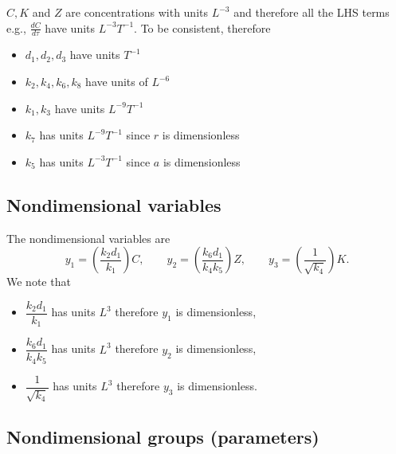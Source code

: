 \documentclass[10pt,letterpaper]{article}
\begin{document}
$C, K$ and $Z$ are concentrations with units $L^{-3}$ and therefore all the LHS terms e.g., $\frac{dC}{d\tau}$ have units $L^{-3} T^{-1}$. To be consistent, therefore

\begin{itemize}
  \item $d_1, d_2, d_3$ have units $T^{-1}$
  \item $k_2, k_4, k_6, k_8$ have units of $L^{-6}$ %
  \item $k_1, k_3$ have units $L^{-9} T^{-1}$
  \item $k_7$ has units $L^{-9} T^{-1}$ since $r$ is dimensionless
  \item $k_5$ has units $L^{-3}T^{-1}$  since $a$ is dimensionless
\end{itemize}


\subsection{Nondimensional variables}
The nondimensional variables are
\begin{equation}\label{eq:variables}
y_1 = \left(\frac{k_2 d_1}{k_1}\right) C, \qquad
y_2 = \left(\frac{k_6 d_1}{k_4 k_5}\right) Z, \qquad
y_3 = \left(\frac{1}{\sqrt{k_4}}\right) K.
\end{equation}
We note that
\begin{itemize}
  \item $\dfrac{k_2 d_1}{k_1}$ has units $L^3$ therefore $y_1$ is dimensionless,
  \item $\dfrac{k_6 d_1}{k_4 k_5}$ has units $L^3$ therefore $y_2$ is dimensionless,
  \item $\dfrac{1}{\sqrt{k_4}}$ has units $L^3$ therefore $y_3$ is dimensionless.
\end{itemize}


\subsection{Nondimensional groups (parameters)}
\end{document}
